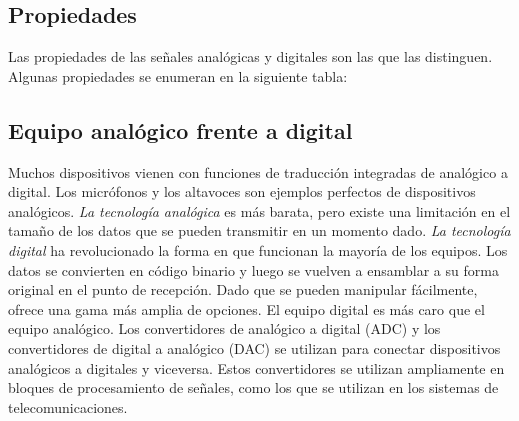\begin{enumerate}
\subsection*{Propiedades}
Las propiedades de las señales analógicas y digitales son las que las distinguen. Algunas propiedades se enumeran en la siguiente tabla:

\begin{figure}[ht!]
\end{figure}

\subsection*{Equipo analógico frente a digital}
Muchos dispositivos vienen con funciones de traducción integradas de analógico a digital. Los micrófonos y los altavoces son ejemplos perfectos de dispositivos analógicos. \textit{La tecnología analógica} es más barata, pero existe una limitación en el tamaño de los datos que se pueden transmitir en un momento dado. \textit{La tecnología digital} ha revolucionado la forma en que funcionan la mayoría de los equipos. Los datos se convierten en código binario y luego se vuelven a ensamblar a su forma original en el punto de recepción. Dado que se pueden manipular fácilmente, ofrece una gama más amplia de opciones. El equipo digital es más caro que el equipo analógico. Los convertidores de analógico a digital (ADC) y los convertidores de digital a analógico (DAC) se utilizan para conectar dispositivos analógicos a digitales y viceversa. Estos convertidores se utilizan ampliamente en bloques de procesamiento de señales, como los que se utilizan en los sistemas de telecomunicaciones.

\end{enumerate}
